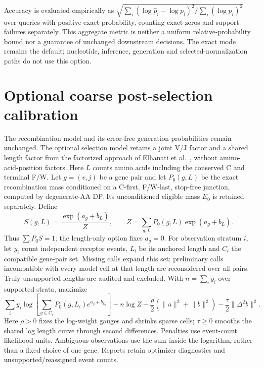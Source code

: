 \documentclass[11pt]{article}
\theoremstyle{oldplain}
\theoremstyle{oldrem}
\begin{document}
Accuracy is evaluated empirically as
$\sqrt{\sum_i(\log\widehat p_i-\log p_i)^2/\sum_i(\log p_i)^2}$ over queries
with positive exact probability, counting exact zeros and support failures
separately. This aggregate metric is neither a uniform relative-probability bound
nor a guarantee of unchanged downstream decisions. The exact mode remains the
default; nucleotide, inference, generation and selected-normalization paths do
not use this option.

\section{Optional coarse post-selection calibration}

The recombination model and its error-free generation probabilities remain
unchanged. The optional selection model retains a joint V/J factor and a shared
length factor from the factorized approach of Elhanati et al.\ \cite{Elhanati2014},
without amino-acid-position factors. Here $L$ counts amino acids including the
conserved C and terminal F/W. Let $g=(v,j)$ be a gene pair and let
$P_0(g,L)$ be the exact recombination mass conditioned on a C-first,
F/W-last, stop-free junction, computed by degenerate-AA DP. Its unconditioned
eligible mass $E_0$ is retained separately. Define
\begin{equation}
 S(g,L)=\frac{\exp(a_g+b_L)}{Z},\qquad
 Z=\sum_{g,L}P_0(g,L)\exp(a_g+b_L).
\end{equation}
Thus $\sum P_0S=1$; the length-only option fixes $a_g=0$.
For observation stratum $i$, let $y_i$ count independent receptor events,
$L_i$ be its anchored length and $C_i$ the compatible gene-pair set.
Missing calls expand this set; preliminary calls incompatible with every model
cell at that length are reconsidered over all pairs. Truly unsupported lengths
are audited and excluded. With $n=\sum_i y_i$ over supported strata, maximize
\begin{equation}
 \sum_i y_i\log\!\left[\sum_{g\in C_i}P_0(g,L_i)e^{a_g+b_{L_i}}\right]
 -n\log Z-\frac{\rho}{2}(\lVert a\rVert^2+\lVert b\rVert^2)
 -\frac{\tau}{2}\lVert\Delta^2 b\rVert^2.
\end{equation}
Here $\rho>0$ fixes the log-weight gauges and shrinks sparse cells;
$\tau\ge0$ smooths the shared log length curve through second differences.
Penalties use event-count likelihood units. Ambiguous observations use the sum
inside the logarithm, rather than a fixed choice of one gene. Reports retain
optimizer diagnostics and unsupported/reassigned event counts.
\end{document}
